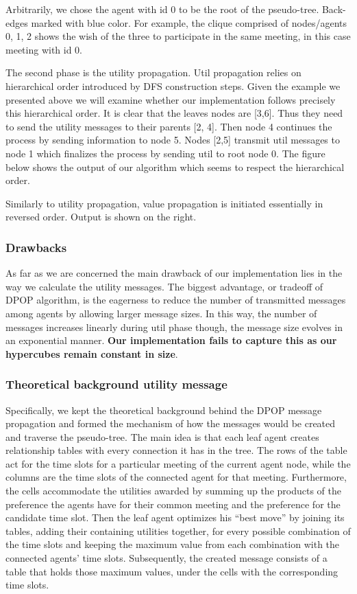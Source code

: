 \documentclass[11pt,a4paper,onecolumn]{article}
\begin{document}
	Arbitrarily, we chose the agent with id 0 to be the root of the pseudo-tree. Back-edges marked with blue color. For example, the clique comprised of nodes/agents { 0, 1, 2 } shows the wish of the three to participate in the same meeting, in this case meeting with id 0.
	
	The second phase is the utility propagation. Util propagation relies on hierarchical order introduced by DFS construction steps. Given the example we presented above we will examine whether our implementation follows precisely this hierarchical order. It is clear that the leaves nodes are [3,6]. Thus they need to send the utility messages to their parents [2, 4]. Then node 4 continues the process by sending information to node 5. Nodes [2,5] transmit util messages to node 1 which finalizes the process by sending util to root node 0. The figure below shows the output of our algorithm which seems to respect the hierarchical order.
	
	Similarly to utility propagation, value propagation is initiated essentially in reversed order. Output is shown on the right.
	\subsubsection{Drawbacks}
	As far as we are concerned the main drawback of our implementation lies in the way we calculate the utility messages. The biggest advantage, or tradeoff of DPOP algorithm, is the eagerness to reduce the number of transmitted messages among agents by allowing larger message sizes. In this way, the number of messages increases linearly during util phase though, the message size evolves in an exponential manner. \textbf{Our implementation fails to capture this as our hypercubes remain constant in size}.
	\subsubsection{Theoretical background utility message}
	Specifically, we kept the theoretical background behind the DPOP message propagation and formed the mechanism of how the messages would be created and traverse the pseudo-tree. The main idea is that each leaf agent creates relationship tables with every connection it has in the tree. The rows of the table act for the time slots for a particular meeting of the current agent node, while the columns are the time slots of the connected agent for that meeting. Furthermore, the cells accommodate the utilities awarded by summing up the products of the preference the agents have for their common meeting and the preference for the candidate time slot. Then the leaf agent optimizes his “best move” by joining its tables, adding their containing utilities together, for every possible combination of the time slots and keeping the maximum value from each combination with the connected agents’ time slots. Subsequently, the created message consists of a table that holds those maximum values, under the cells with the corresponding time slots.
	
\end{document}
